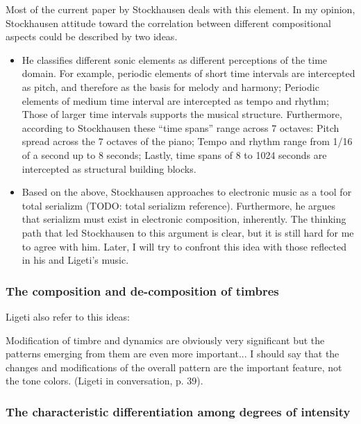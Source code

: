 \documentclass[a4paper,11pt]{article}
\newenvironment{MyShadequote}[1][]{%
    \ignorespaces%
    \begin{mdframed}[style=MyShadeQuoteStyle,#1]%
}{%
    \end{mdframed}%
    \ignorespacesafterend%
}%
\begin{document}
Most of the current paper by Stockhausen deals with this element.
In my opinion, Stockhausen attitude toward the correlation between different compositional aspects could be described by two ideas.

\begin{itemize}
    \item He classifies different sonic elements as different perceptions of the time domain.
    For example, periodic elements of short time intervals are intercepted as pitch, and therefore as the basis for melody and harmony;
    Periodic elements of medium time interval are intercepted as tempo and rhythm;
    Those of larger time intervals supports the musical structure.
    Furthermore, according to Stockhausen these ``time spans'' range across 7 octaves:
    Pitch spread across the 7 octaves of the piano;
    Tempo and rhythm range from 1/16 of a second up to 8 seconds;
    Lastly, time spans of 8 to 1024 seconds are intercepted as structural building blocks.

    \item Based on the above, Stockhausen approaches to electronic music as a tool for total serializm (TODO: {total serializm reference}).
    Furthermore, he argues that serializm must exist in electronic composition, inherently.
    The thinking path that led Stockhausen to this argument is clear, but it is still hard for me to agree with him.
    Later, I will try to confront this idea with those reflected in his and Ligeti's music.
\end{itemize}

\subsubsection{The composition and de-composition of timbres}
\label{subs:stockhausen:timber}

Ligeti also refer to this ideas:

\begin{MyShadequote}
  Modification of timbre and dynamics are obviously very significant but the patterns emerging from them are even more important...
  I should say that the changes and modifications of the overall pattern are the important feature, not the tone colors. (Ligeti in conversation, p. 39).
\end{MyShadequote}

\subsubsection{The characteristic differentiation among degrees of intensity}
\label{subs:stockhausen:intensity}
\end{document}
